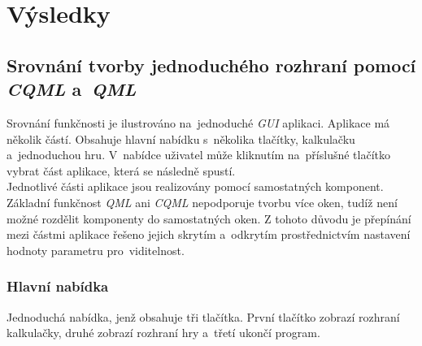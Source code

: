 \documentclass[11pt,twoside,a4paper]{book}
\begin{document}
\chapter{\label{CH:conc}Výsledky}
\section[Tvorba \textit{GUI} pomocí \textit{QML} a \textit{CQML}]{\label{SEC:Conclusion}Srovnání tvorby jednoduchého rozhraní pomocí \textit{CQML} a~\textit{QML}}
Srovnání funkčnosti je ilustrováno na~jednoduché \textit{GUI} aplikaci. Aplikace má několik částí. Obsahuje hlavní nabídku s~několika tlačítky, kalkulačku a~jednoduchou hru. V~nabídce uživatel může kliknutím na~příslušné tlačítko vybrat část aplikace, která se následně spustí.\\
Jednotlivé části aplikace jsou realizovány pomocí samostatných komponent. Základní funkčnost \textit{QML} ani \textit{CQML} nepodporuje tvorbu více oken, tudíž není možné rozdělit komponenty do samostatných oken. Z tohoto důvodu je přepínání mezi částmi aplikace řešeno jejich skrytím a~odkrytím prostřednictvím nastavení hodnoty parametru pro~viditelnost.
\subsection{Hlavní nabídka}
Jednoduchá nabídka, jenž obsahuje tři tlačítka. První tlačítko zobrazí rozhraní kalkulačky, druhé zobrazí rozhraní hry a~třetí ukončí program.
\end{document}
